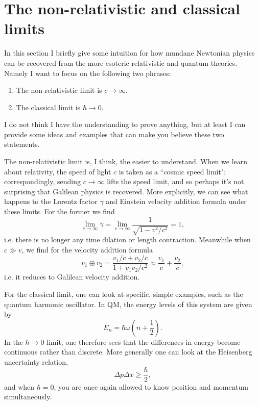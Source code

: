 \section{The non-relativistic and classical limits}

In this section I briefly give some intuition for how mundane Newtonian
physics can be recovered from the more esoteric relativistic and quantum
theories. Namely  I want to focus on 
the following two phrases:
\begin{enumerate}
  \item The non-relativistic limit is $c\to\infty$.
  \item The classical limit is $\hbar\to0$.
\end{enumerate}
I do not think I have the understanding to prove anything, but at least I
can provide some ideas and examples that can make you believe these
two statements.

The non-relativistic limit is, I think, the easier to understand. When we
learn about relativity, the speed of light $c$ is taken as a ``cosmic speed
limit"; correspondingly, sending $c\to\infty$ lifts the speed limit, and
so perhaps it's not surprising that Galilean physics is recovered.
More explicitly, we can see what happens to the Lorentz factor $\gamma$ and
Einstein velocity addition formula under these limits. For the former
we find
\begin{equation}
  \lim_{c\to\infty}\gamma
  =\lim_{c\to\infty}\frac{1}{\sqrt{1-v^2/c^2}}=1,
\end{equation}
i.e. there is no longer any time dilation or length contraction.
Meanwhile when $c\gg v$, we find for the velocity addition formula 
\begin{equation}
  v_1\oplus v_2
  =\frac{v_1/c + v_2/c}{1+v_1v_2/c^2}
  \approx \frac{v_1}{c} + \frac{v_2}{c}, 
\end{equation}
i.e. it reduces to Galilean velocity addition.

For the classical limit, one can look at specific, simple examples, such as
the quantum harmonic oscillator. In QM, the energy levels of this system
are given by
\begin{equation}
  E_n=\hbar\omega\left(n+\frac{1}{2}\right).
\end{equation}
In the $\hbar\to0$ limit, one therefore sees that the differences in energy
become continuous rather than discrete. More generally one can look at
the Heisenberg uncertainty relation,
\begin{equation}
  \Delta p\Delta x\geq \frac{\hbar}{2},
\end{equation}
and when $\hbar=0$, you are once again allowed to know position and
momentum simultaneously.

